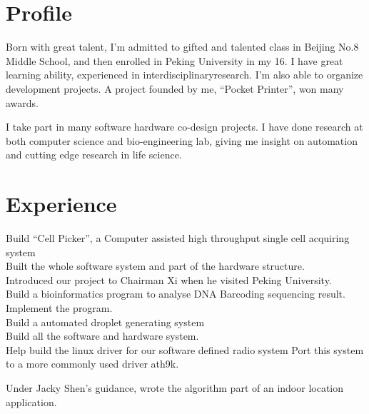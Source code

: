 \documentclass[]{deedy-resume-openfont}
\begin{document}
\hfill
\begin{minipage}[t]{0.62\textwidth} 

\section{Profile}
Born with great talent, I’m admitted to gifted and talented class in Beijing No.8 Middle School, and then enrolled in Peking University in my 16. I have great learning ability, experienced in interdisciplinaryresearch. I’m also able to organize development projects. A project founded by me, “Pocket Printer”, won many awards.

I take part in many software hardware co-design projects. I have done research at both computer science and bio-engineering lab, giving me insight on automation and cutting edge research in life science.


\section{Experience}
Build “Cell Picker”, a Computer assisted high throughput single cell acquiring system\\
Built the whole software system and part of the hardware structure.\\
Introduced our project to Chairman Xi when he visited Peking University.\\
Build a bioinformatics program to analyse DNA Barcoding sequencing result.\\
Implement the program.\\
Build a automated droplet generating system\\
Build all the software and hardware system.\\

Help build the linux driver for our software defined radio system
Port this system to a more commonly used driver ath9k.

Under Jacky Shen's guidance, wrote the algorithm part of an indoor location application.


\end{minipage}
\end{document}
